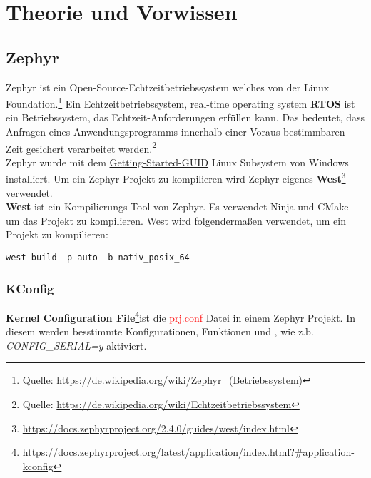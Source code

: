 \newpage
\section{Theorie und Vorwissen}
\subsection{Zephyr}
    Zephyr ist ein Open-Source-Echtzeitbetriebssystem welches von der Linux Foundation.\footnote{Quelle: \url{https://de.wikipedia.org/wiki/Zephyr_(Betriebssystem)}}
    Ein Echtzeitbetriebssystem, real-time operating system \textbf{RTOS} ist ein Betriebssystem, das Echtzeit-Anforderungen erfüllen kann. 
    Das bedeutet, dass Anfragen eines Anwendungsprogramms innerhalb einer Voraus bestimmbaren Zeit gesichert verarbeitet werden.\footnote{Quelle: \url{https://de.wikipedia.org/wiki/Echtzeitbetriebssystem}}
    \\
    Zephyr wurde mit dem \href{https://docs.zephyrproject.org/latest/getting_started/index.html}{Getting-Started-GUID} Linux Subsystem von Windows installiert. 
    Um ein Zephyr Projekt zu kompilieren wird Zephyr eigenes \textbf{West}\footnote{\url{https://docs.zephyrproject.org/2.4.0/guides/west/index.html}} verwendet.\\
    \textbf{West} ist ein Kompilierungs-Tool von Zephyr. Es verwendet Ninja und CMake um das Projekt zu kompilieren. 
    West wird folgendermaßen verwendet, um ein Projekt zu kompilieren: 
    \begin{lstlisting}[style=StyleC, captionpos=b, caption=West Beispiel, label=West Beispiel]
west build -p auto -b nativ_posix_64 
    \end{lstlisting}

    \subsubsection{KConfig}
    \textbf{Kernel Configuration File}\footnote{\url{https://docs.zephyrproject.org/latest/application/index.html?\#application-kconfig}}ist die \textcolor{red}{prj.conf} Datei in einem 
    Zephyr Projekt. In diesem werden besstimmte Konfigurationen, Funktionen und , wie z.b. \textit{CONFIG\_SERIAL=y} aktiviert. 


\newpage
